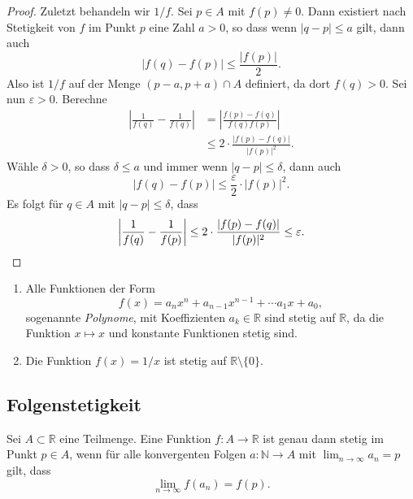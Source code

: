 \documentclass[../main.tex]{subfiles}
\begin{document}
\begin{proof}
  Zuletzt behandeln wir $1/f$.
  Sei $p \in A$ mit $f(p) \neq 0$.
  Dann existiert nach Stetigkeit von
  $f$ im Punkt $p$ eine Zahl $a > 0$, so dass
  wenn $|q - p| \leq a$ gilt,
  dann auch
  \[
  |f(q) - f(p)| \leq \frac{|f(p)|}{2}.
  \]
  Also ist $1/f$ auf der Menge $(p-a, p+a) \cap A$ definiert,
  da dort $f(q) > 0$.
  Sei nun $\varepsilon > 0$. 
  Berechne
   \begin{align*}
     \left| \frac{1}{f(q)} - \frac{1}{f(q)} \right| 
     & = \left| \frac{f(p) - f(q)}{f(q)f(p)} \right| \\
     & \leq 2 \cdot \frac{|f(p) - f(q)|}{|f(p)|^2}. 
  \end{align*}
  Wähle $\delta > 0$, so dass $\delta \leq a$ 
  und immer wenn $|q - p| \leq \delta$,
  dann auch 
  \[
    |f(q) - f(p)| \leq \frac{\varepsilon}{2} \cdot |f(p)|^2.
  \]
  Es folgt für $q \in A$ mit $|q - p| \leq \delta$, dass
  \[
    \left| \frac{1}{f(q)}- \frac{1}{f(p)} \right|
    \leq 2 \cdot \frac{|f(p) - f(q)|}{|f(p)|^2} \leq \varepsilon.
    \qedhere
  \]
\end{proof}

\begin{applications}
  \leavevmode
  \begin{enumerate}[(1)]
    \item Alle Funktionen der Form
      \[
        f(x) = a_n x^n + a_{n-1} x^{n-1} + \cdots a_{1} x + a_0,
      \]
      sogenannte \emph{Polynome},
      mit Koeffizienten $a_k \in \mathbb{R}$ sind stetig
      auf $\mathbb{R}$, da die Funktion $x \mapsto x$
      und konstante Funktionen stetig sind.
    \item Die Funktion $f(x) = 1/x$ ist stetig
      auf $\mathbb{R} \setminus \{0\}$.
  \end{enumerate}
\end{applications}

\subsection*{Folgenstetigkeit}
\begin{theorem}
  Sei $A \subset \mathbb{R}$ eine Teilmenge.
  Eine Funktion $f \colon A \to \mathbb{R}$ ist
  genau dann stetig im Punkt
  $p \in A$, wenn für alle
  konvergenten Folgen $a \colon \mathbb{N} \to A$
  mit $\lim_{n \to \infty}a_n = p$ gilt, dass
  \[
    \lim_{n \to \infty} f(a_n) = f(p).
  \]
\end{theorem}
\end{document}
